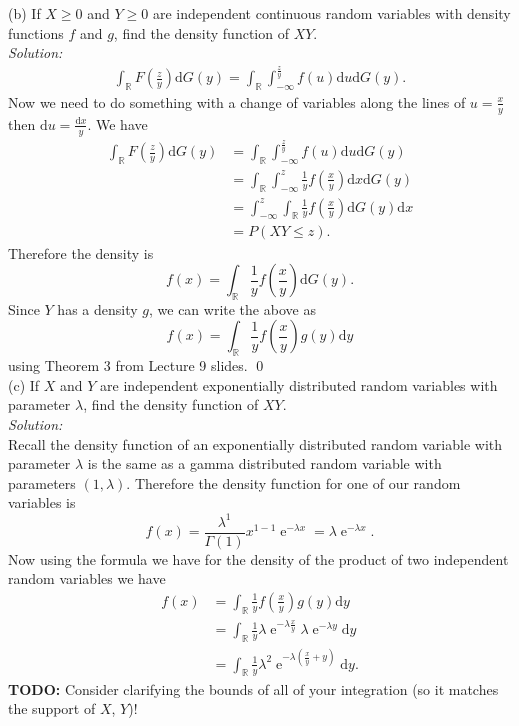 \documentclass[10pt]{amsart}
\newcommand{\D}{\mathrm{d}}
\DeclareMathOperator{\E}{e}
\begin{document}
(b) If $X \geq 0$ and $Y \geq 0$ are independent continuous random variables with density functions $f$ and $g$, find the density function of $XY$. \\
\textit{Solution:} \\
\begin{align*}
\int_{\mathbb R} F\left(\frac z y \right) \D G(y) = \int_{\mathbb R} \int_{-\infty}^{\frac z y} f\left(u \right) \D u \D G(y).
\end{align*}
Now we need to do something with a change of variables along the lines of $u = \frac x y$ then $\D u = \frac{\D x}{y}$. We have
\begin{align*}
\int_{\mathbb R} F\left(\frac z y \right) \D G(y)
	&= \int_{\mathbb R} \int_{-\infty}^{\frac z y} f\left(u \right) \D u \D G(y) \\
	&= \int_{\mathbb R} \int_{-\infty}^z \frac {1}{y}f\left(\frac x y \right) \D x \D G(y) \\
	&= \int_{-\infty}^z \int_{\mathbb R} \frac {1}{y}f\left(\frac x y \right) \D G(y)\D x \\
	&= P\left( XY \leq z \right).
\end{align*}
Therefore the density is
$$
f(x) = \int_{\mathbb R} \frac {1}{y}f\left(\frac x y \right) \D G(y).
$$
Since $Y$ has a density $g$, we can write the above as
$$
f(x) = \int_{\mathbb R} \frac {1}{y}f\left(\frac x y \right)g(y)\D y
$$
using Theorem 3 from Lecture 9 slides.
\qed \\

(c) If $X$ and $Y$ are independent exponentially distributed random variables with parameter $\lambda$, find the density function of $XY$.\\
\textit{Solution:} \\
Recall the density function of an exponentially distributed random variable with parameter $\lambda$ is the same as a gamma distributed random variable with parameters $(1, \lambda)$.
Therefore the density function for one of our random variables is
$$
f(x) = \frac {\lambda^1} {\Gamma(1)} x^{1 - 1} \E^{-\lambda x} = \lambda \E^{-\lambda x}.
$$
Now using the formula we have for the density of the product of two independent random variables we have
\begin{align*}
f(x) &= \int_{\mathbb R} \frac {1}{y}f\left(\frac x y \right)g(y)\D y \\
	&= \int_{\mathbb R} \frac {1}{y} \lambda \E^{-\lambda \frac x y} \lambda \E^{-\lambda y} \D y \\
	&= \int_{\mathbb R} \frac {1}{y} \lambda^2 \E^{-\lambda \left( \frac x y + y \right)} \D y.
\end{align*}
\textbf{TODO:} Consider clarifying the bounds of all of your integration (so it matches the support of $X$, $Y$)!
\\
\end{document}
